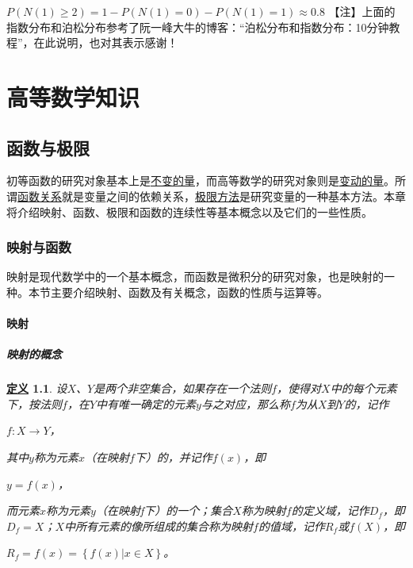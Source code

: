 \documentclass[11pt]{book}
\newcounter{#2}
\newcounter{#2}[#1]
\numberwithin{#2}{#1}
\newtheorem{newdef}{\textbf{\uline{定义}}}[chapter]
\newcommand{\inlinekeywords}[1]{\uline{#1}}
\newcommand{\inlineglossary}[1]{\uwave{#1}\index{#1}}
\begin{document}
$ P\left( N\left( 1 \right) \geq 2 \right) =1-P\left( N\left( 1 \right)=0  \right) - P\left( N\left( 1 \right)=1  \right)\approx 0.8 $
【注】上面的指数分布和泊松分布参考了阮一峰大牛的博客：“泊松分布和指数分布：10分钟教程”，在此说明，也对其表示感谢！


\part{高等数学知识}
	\chapter{函数与极限}
		初等函数的研究对象基本上是\inlinekeywords{不变的量}，而高等数学的研究对象则是\inlinekeywords{变动的量}。所谓\inlinekeywords{函数关系}就是变量之间的依赖关系，\inlinekeywords{极限方法}是研究变量的一种基本方法。本章将介绍映射、函数、极限和函数的连续性等基本概念以及它们的一些性质。
	\section{映射与函数}
		映射是现代数学中的一个基本概念，而函数是微积分的研究对象，也是映射的一种。本节主要介绍映射、函数及有关概念，函数的性质与运算等。
		
		\subsection{映射}
		\subsubsection{映射的概念}
		\begin{newdef}
			设$ X $、$ Y $是两个非空集合，如果存在一个法则$ f $，使得对$ X $中的每个元素下，按法则$ f $，在$ Y $中有唯一确定的元素$ y $与之对应，那么称$ f $为从$ X $到$ Y $的\inlineglossary{映射}，记作 \\		
			\centerline{$ f:X\rightarrow Y $，}
			其中$ y $称为元素$ x $（在映射$ f $下）的\inlineglossary{像}，并记作$ f(x) $，即 \\
			\centerline{$ y=f(x) $，}
			而元素$ x $称为元素$ y $（在映射f下）的一个\inlineglossary{原像}；集合$ X $称为映射$ f $的定义域，记作$ D_f $，即$ D_f=X $；$ X $中所有元素的像所组成的集合称为映射$ f $的值域，记作$ R_f $或$ f(X) $，即
			\centerline{$ R_f=f(x)=\left\lbrace f(x)|x\in X \right\rbrace  $。}
		\end{newdef}
		
\end{document}
